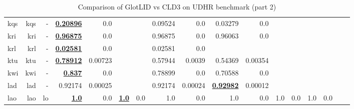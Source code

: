 \documentclass[11pt]{article}
\def\udhr{UDHR\xspace}
\begin{document}
\begin{table*}[h]
{\begin{tabular}{lrrrrrrrrrrrrrrrr}
kqs         & kqs         & -         & \textbf{\underline{0.20896}}         & 0.0         &          &          & 0.09524         & 0.0         & 0.03279         & 0.0         &          &          &          &          \\
kri         & kri         & -         & \textbf{\underline{0.96875}}         & 0.0         &          &          & 0.96875         & 0.0         & 0.96063         & 0.0         &          &          &          &          \\
krl         & krl         & -         & \textbf{\underline{0.02581}}         & 0.0         &          &          & 0.02581         & 0.0         &          &          &          &          &          &          \\
ktu         & ktu         & -         & \textbf{\underline{0.78912}}         & 0.00723         &          &          & 0.57944         & 0.0039         & 0.54369         & 0.00354         &          &          &          &          \\
kwi         & kwi         & -         & \textbf{\underline{0.837}}         & 0.0         &          &          & 0.78899         & 0.0         & 0.70588         & 0.0         &          &          &          &          \\
lad         & lad         & -         & 0.92174         & 0.00025         &          &          & 0.92174         & 0.00024         & \textbf{\underline{0.92982}}         & 0.00012         &          &          &          &          \\
lao         & lao         & lo         & \textbf{\underline{1.0}}         & 0.0         & \textbf{\underline{1.0}}         & 0.0         & 1.0         & 0.0         & 1.0         & 0.0         & 1.0         & 0.0         & 1.0         & 0.0         \\
\end{tabular}
}
\caption{Comparison of GlotLID vs CLD3 on \udhr benchmark (part 2)}
\label{tab:appendix_glotlid_cld3_udhr_2}
\end{table*}
\end{document}
